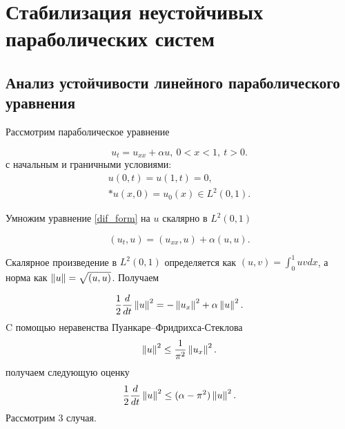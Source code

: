 \section{Стабилизация неустойчивых параболических систем}
\vspace{1em}

\subsection{Анализ устойчивости линейного параболического уравнения}

Рассмотрим параболическое уравнение

\begin{equation}\label{dif_form}
    u_t = u_{xx} + \alpha u, \ 0 < x < 1, \ t > 0.
\end{equation}
с начальным и граничными условиями:
\begin{gather}\label{d_control}
    u(0, t) = u(1, t) = 0, \\*
    u(x, 0) = u_{0}(x) \in L^2(0, 1). \nonumber
\end{gather}

Умножим уравнение \eqref{dif_form} на $u$ скалярно в $L^2(0, 1)$

\begin{equation*}
    (u_t, u) = (u_{xx}, u) + \alpha (u, u).
\end{equation*}

Скалярное произведение в $L^2(0, 1)$ определяется как $(u, v) = \int_0^1 uv dx$,
а норма как $\left\lVert u\right\rVert = \sqrt{(u, u)}$. Получаем

\begin{equation}\label{int_form}
    \frac{1}{2}\frac{d}{dt}\left\lVert u\right\rVert^2 = -\left\lVert u_x\right\rVert^2 + \alpha \left\lVert u\right\rVert^2.
\end{equation}
C помощью неравенства Пуанкаре–Фридрихса-Стеклова
\begin{equation*}
    \left\lVert u\right\rVert^2 \le \frac{1}{\pi^2} \left\lVert u_x\right\rVert^2.
\end{equation*}
получаем следующую оценку 
\begin{equation}\label{stable_opr}
    \frac{1}{2}\frac{d}{dt}\left\lVert u\right\rVert^2 \le (\alpha - \pi^2)\left\lVert u\right\rVert^2.
\end{equation}
Рассмотрим 3 случая.

